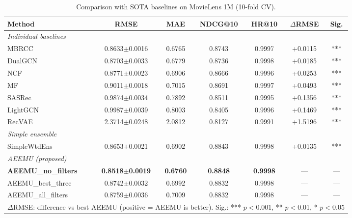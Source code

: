 \begin{table}[htbp]
\centering
\caption{Comparison with SOTA baselines on MovieLens 1M (10-fold CV).}
\label{tab:sota-movielens-1m}
\begin{adjustbox}{max width=\textwidth}
\begin{tabular}{l ccc cc c}
\toprule
\textbf{Method} & \textbf{RMSE} & \textbf{MAE} & \textbf{NDCG@10} & \textbf{HR@10} & \textbf{$\Delta$RMSE} & \textbf{Sig.} \\
\midrule
\multicolumn{7}{l}{\textit{Individual baselines}} \\
MBRCC & 0.8633$\pm$0.0016 & 0.6765 & 0.8743 & 0.9997 & +0.0115 & *** \\
DualGCN & 0.8703$\pm$0.0033 & 0.6779 & 0.8736 & 0.9998 & +0.0185 & *** \\
NCF & 0.8771$\pm$0.0023 & 0.6906 & 0.8666 & 0.9996 & +0.0253 & *** \\
MF & 0.9011$\pm$0.0018 & 0.7015 & 0.8691 & 0.9997 & +0.0493 & *** \\
SASRec & 0.9874$\pm$0.0034 & 0.7892 & 0.8511 & 0.9995 & +0.1356 & *** \\
LightGCN & 0.9987$\pm$0.0039 & 0.8003 & 0.8405 & 0.9996 & +0.1469 & *** \\
RecVAE & 2.3714$\pm$0.0248 & 2.0812 & 0.8127 & 0.9991 & +1.5196 & *** \\
\midrule
\multicolumn{7}{l}{\textit{Simple ensemble}} \\
SimpleWtdEns & 0.8653$\pm$0.0021 & 0.6902 & 0.8843 & 0.9998 & +0.0135 & *** \\
\midrule
\multicolumn{7}{l}{\textit{AEEMU (proposed)}} \\
\textbf{AEEMU\_no\_filters} & \textbf{0.8518$\pm$0.0019} & \textbf{0.6760} & \textbf{0.8848} & \textbf{0.9998} & --- & --- \\
AEEMU\_best\_three & 0.8742$\pm$0.0032 & 0.6992 & 0.8832 & 0.9998 & --- & --- \\
AEEMU\_all\_filters & 0.8759$\pm$0.0036 & 0.7009 & 0.8832 & 0.9998 & --- & --- \\
\bottomrule
\multicolumn{7}{l}{\footnotesize $\Delta$RMSE: difference vs best AEEMU (positive = AEEMU is better). Sig.: *** $p<$0.001, ** $p<$0.01, * $p<$0.05} \\
\end{tabular}
\end{adjustbox}
\end{table}